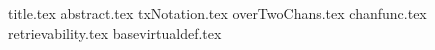 \documentclass{llncs}
\begin{document}
\pagestyle{plain}
{title.tex}
{abstract.tex}
{txNotation.tex}
{overTwoChans.tex}
{chanfunc.tex}
{retrievability.tex}
{basevirtualdef.tex}

\end{document}
